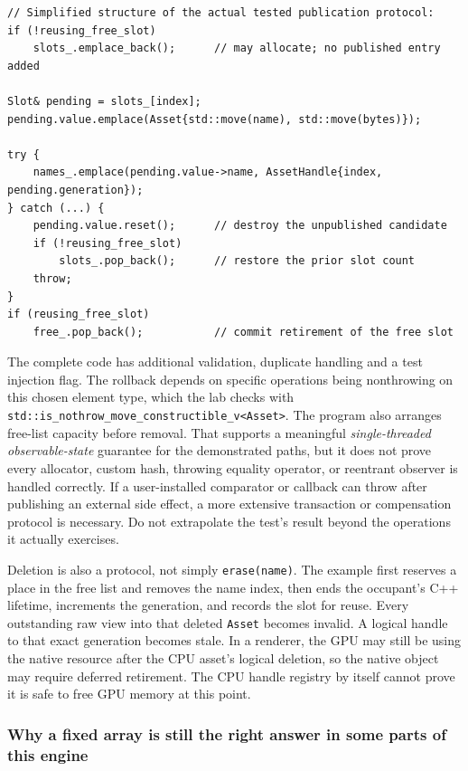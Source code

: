 \begin{verbatim}
// Simplified structure of the actual tested publication protocol:
if (!reusing_free_slot)
    slots_.emplace_back();      // may allocate; no published entry added

Slot& pending = slots_[index];
pending.value.emplace(Asset{std::move(name), std::move(bytes)});

try {
    names_.emplace(pending.value->name, AssetHandle{index, pending.generation});
} catch (...) {
    pending.value.reset();      // destroy the unpublished candidate
    if (!reusing_free_slot)
        slots_.pop_back();      // restore the prior slot count
    throw;
}
if (reusing_free_slot)
    free_.pop_back();           // commit retirement of the free slot
\end{verbatim}

The complete code has additional validation, duplicate handling and a test injection flag. The rollback depends on specific operations being nonthrowing on this chosen element type, which the lab checks with \texttt{std::is\_nothrow\_move\_constructible\_v\textless{}Asset\textgreater{}}. The program also arranges free-list capacity before removal. That supports a meaningful \emph{single-threaded observable-state} guarantee for the demonstrated paths, but it does not prove every allocator, custom hash, throwing equality operator, or reentrant observer is handled correctly. If a user-installed comparator or callback can throw after publishing an external side effect, a more extensive transaction or compensation protocol is necessary. Do not extrapolate the test's result beyond the operations it actually exercises.

Deletion is also a protocol, not simply \texttt{erase(name)}. The example first reserves a place in the free list and removes the name index, then ends the occupant's C++ lifetime, increments the generation, and records the slot for reuse. Every outstanding raw view into that deleted \texttt{Asset} becomes invalid. A logical handle to that exact generation becomes stale. In a renderer, the GPU may still be using the native resource after the CPU asset's logical deletion, so the native object may require deferred retirement. The CPU handle registry by itself cannot prove it is safe to free GPU memory at this point.

\subsubsection{Why a fixed array is still the right answer in some parts of this engine}\label{why-a-fixed-array-is-still-the-right-answer-in-some-parts-of-this-engine}


